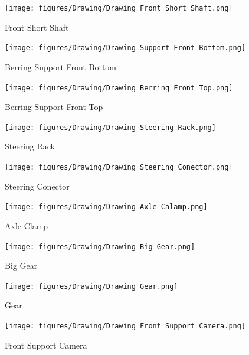 \documentclass[12pt,a4paper]{article}
\begin{document}
\begin{figure}[H]
    \vspace{4cm}
    \centering
    \texttt{[image: figures/Drawing/Drawing Front Short Shaft.png]}
    \caption{Front Short Shaft}
\end{figure}

\begin{figure}[H]
    \vspace{4cm}
    \centering
    \texttt{[image: figures/Drawing/Drawing Support Front Bottom.png]}
    \caption{Berring Support Front Bottom}
\end{figure}

\begin{figure}[H]
    \vspace{4cm}
    \centering
    \texttt{[image: figures/Drawing/Drawing Berring Front Top.png]}
    \caption{Berring Support Front Top}
\end{figure}

\begin{figure}[H]
    \vspace{4cm}
    \centering
    \texttt{[image: figures/Drawing/Drawing Steering Rack.png]}
    \caption{Steering Rack}
\end{figure}

\begin{figure}[H]
    \vspace{4cm}
    \centering
    \texttt{[image: figures/Drawing/Drawing Steering Conector.png]}
    \caption{Steering Conector}
\end{figure}

\begin{figure}[H]
    \vspace{4cm}
    \centering
    \texttt{[image: figures/Drawing/Drawing Axle Calamp.png]}
    \caption{Axle Clamp}
\end{figure}

\begin{figure}[H]
    \vspace{4cm}
    \centering
    \texttt{[image: figures/Drawing/Drawing Big Gear.png]}
    \caption{Big Gear}
\end{figure}

\begin{figure}[H]
    \vspace{4cm}
    \centering
    \texttt{[image: figures/Drawing/Drawing Gear.png]}
    \caption{Gear}
\end{figure}

\begin{figure}[H]
    \vspace{4cm}
    \centering
    \texttt{[image: figures/Drawing/Drawing Front Support Camera.png]}
    \caption{Front Support Camera}
\end{figure}
\end{document}
